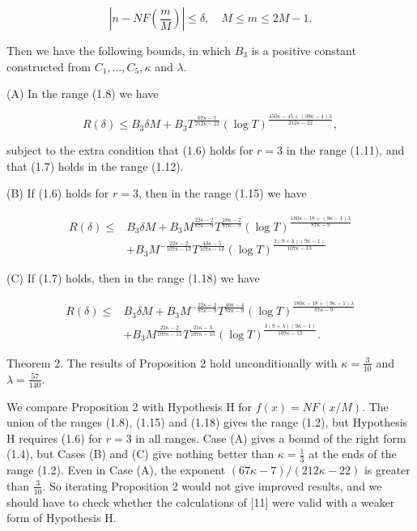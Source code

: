 \documentclass[10pt]{article}
\begin{document}
\begin{equation*}
\left|n-N F\left(\frac{m}{M}\right)\right| \leqslant \delta, \quad M \leqslant m \leqslant 2 M-1. \tag{1.21}
\end{equation*}


Then we have the following bounds, in which $B_{3}$ is a positive constant constructed from $C_{1}, \ldots, C_{5}, \kappa$ and $\lambda$.

(A) In the range (1.8) we have

\begin{equation*}
R(\delta) \leqslant B_{3} \delta M+B_{3} T^{\frac{67 \kappa-7}{212 \kappa-22}}(\log T)^{\frac{450 \kappa-45+(39 \kappa-4) \lambda}{212 \kappa-22}}, \tag{1.22}
\end{equation*}


subject to the extra condition that (1.6) holds for $r=3$ in the range (1.11), and that (1.7) holds in the range (1.12).

(B) If (1.6) holds for $r=3$, then in the range (1.15) we have


\begin{align*}
R(\delta) \leqslant & B_{3} \delta M+B_{3} M^{\frac{22 \kappa-2}{87 \kappa-9}} T^{\frac{18 \kappa-2}{87 \kappa-9}}(\log T)^{\frac{180 \kappa-18+(9 \kappa-1) \lambda}{87 \kappa-9}} \\
& +B_{3} M^{-\frac{22 \kappa-2}{107 \kappa-13}} T^{\frac{43 \kappa-5}{107 \kappa-13}}(\log T)^{\frac{3(9+\lambda)(9 \kappa-1)}{107 \kappa-13}} \tag{1.23}
\end{align*}


(C) If (1.7) holds, then in the range (1.18) we have


\begin{align*}
R(\delta) \leqslant & B_{3} \delta M+B_{3} M^{-\frac{22 \kappa-2}{87 \kappa-9}} T^{\frac{40 \kappa-4}{87 \kappa-9}}(\log T)^{\frac{180 \kappa-18+(9 \kappa-1) \lambda}{87 \kappa-9}} \\
& +B_{3} M^{\frac{22 \kappa-2}{107 \kappa-13}} T^{\frac{21 \kappa-3}{107 \kappa-13}}(\log T)^{\frac{3(9+\lambda)(9 \kappa-1)}{107 \kappa-13}}. \tag{1.24}
\end{align*}


Theorem 2. The results of Proposition 2 hold unconditionally with $\kappa=\frac{3}{10}$ and $\lambda=\frac{57}{140}$.

We compare Proposition 2 with Hypothesis H for $f(x)=N F(x / M)$. The union of the ranges (1.8), (1.15) and (1.18) gives the range (1.2), but Hypothesis H requires (1.6) for $r=3$ in all ranges. Case (A) gives a bound of the right form (1.4), but Cases (B) and (C) give nothing better than $\kappa=\frac{1}{3}$ at the ends of the range (1.2). Even in Case (A), the exponent $(67 \kappa-7) /(212 \kappa-22)$ is greater than $\frac{3}{10}$. So iterating Proposition 2 would not give improved results, and we should have to check whether the calculations of [11] were valid with a weaker form of Hypothesis H.
\end{document}
